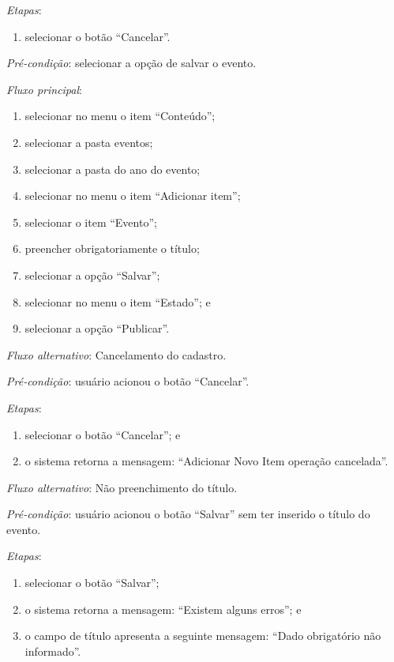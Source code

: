 \noindent \textit{Etapas}:

\begin{enumerate}
    \item selecionar o botão ``Cancelar''.
\end{enumerate}


\vspace{0.7cm}

\noindent \textit{Pré-condição}: selecionar a opção de salvar o evento.

\noindent \textit{Fluxo principal}:

\begin{enumerate}
    \item selecionar no menu o item ``Conteúdo'';
    \item selecionar a pasta eventos;
    \item selecionar a pasta do ano do evento;
    \item selecionar no menu o item ``Adicionar item'';
    \item selecionar o item ``Evento'';
    \item preencher obrigatoriamente o título;
    \item selecionar a opção ``Salvar'';
    \item selecionar no menu o item ``Estado''; e
    \item selecionar a opção ``Publicar''.
\end{enumerate}

\noindent \textit{Fluxo alternativo}: Cancelamento do cadastro.

\noindent \textit{Pré-condição}:  usuário acionou o botão ``Cancelar''.

\noindent \textit{Etapas}:

\begin{enumerate}
    \item selecionar o botão ``Cancelar''; e
    \item o sistema retorna a mensagem: ``Adicionar Novo Item operação cancelada''.
\end{enumerate}

\noindent \textit{Fluxo alternativo}: Não preenchimento do título.

\noindent \textit{Pré-condição}: usuário acionou o botão ``Salvar'' sem ter inserido o título do evento.

\noindent \textit{Etapas}:

\begin{enumerate}
    \item selecionar o botão ``Salvar'';
    \item o sistema retorna a mensagem: ``Existem alguns erros''; e
    \item o campo de título apresenta a seguinte mensagem: ``Dado obrigatório não informado''.
\end{enumerate}



